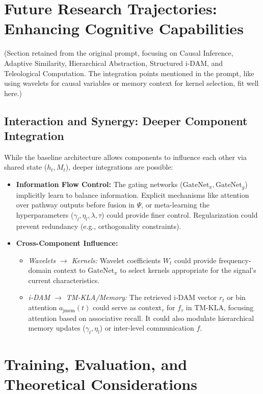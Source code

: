 \documentclass{article}
\begin{document}
\section{Future Research Trajectories: Enhancing Cognitive Capabilities}
(Section retained from the original prompt, focusing on Causal Inference, Adaptive Similarity, Hierarchical Abstraction, Structured i-DAM, and Teleological Computation. The integration points mentioned in the prompt, like using wavelets for causal variables or memory context for kernel selection, fit well here.)

\subsection{Interaction and Synergy: Deeper Component Integration}
While the baseline architecture allows components to influence each other via shared state ($h_t, M_t$), deeper integrations are possible:
\begin{itemize}
    \item \textbf{Information Flow Control:} The gating networks ($\text{GateNet}_\pi, \text{GateNet}_g$) implicitly learn to balance information. Explicit mechanisms like attention over pathway outputs before fusion in $\Psi$, or meta-learning the hyperparameters ($\gamma_l, \eta_l, \lambda, \tau$) could provide finer control. Regularization could prevent redundancy (e.g., orthogonality constraints).
    \item \textbf{Cross-Component Influence:}
    \begin{itemize}
        \item \textit{Wavelets $\to$ Kernels:} Wavelet coefficients $W_t$ could provide frequency-domain context to $\text{GateNet}_\pi$ to select kernels appropriate for the signal's current characteristics.
        \item \textit{i-DAM $\to$ TM-KLA/Memory:} The retrieved i-DAM vector $r_t$ or bin attention $a_{\text{jmem}}(t)$ could serve as $\text{context}_\tau$ for $f_\tau$ in TM-KLA, focusing attention based on associative recall. It could also modulate hierarchical memory updates ($\gamma_l, \eta_l$) or inter-level communication $f$.
    \end{itemize}
\end{itemize}

\section{Training, Evaluation, and Theoretical Considerations}
\end{document}
